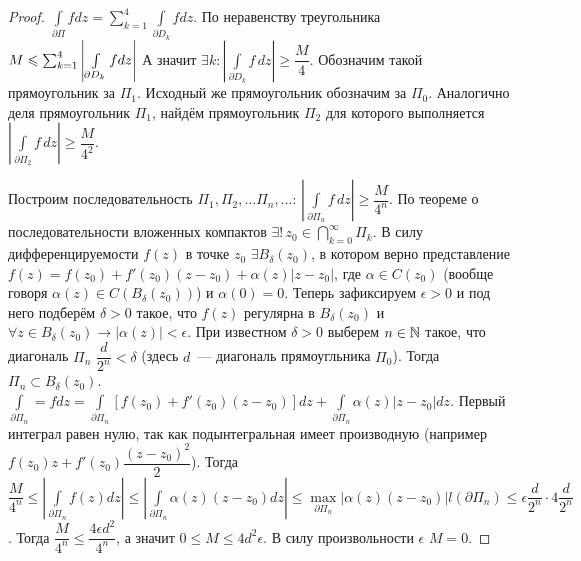 \begin{proof}
\begin{minipage}[c]{0.28\textwidth}
\end{minipage}%
\hfill
\begin{minipage}[c]{0.70\textwidth}
    \(\int\limits_{\partial\Pi} fdz = \sum_{k=1}^{4} \int\limits_{\partial D_k} fdz.\)
    По неравенству треугольника \(M \hm\le \sum_{k=1}^{4} \left|\int\limits_{\partial D_k} fdz
    \right|\) А значит \(\exists k : \left| \int\limits_{\partial D_k} f\,dz \right| \ge
    \dfrac{M}{4}.\) Обозначим такой прямоугольник за \(\Pi_1\). Исходный же прямоугольник обозначим
    за \(\Pi_0\). Аналогично деля прямоугольник \(\Pi_1\), найдём прямоугольник \(\Pi_2\) для
    которого выполняется \( \left| \int\limits_{\partial \Pi_2} f\,dz \right| \ge \dfrac{M}{4^2}\).
\end{minipage}
    Построим последовательность \(\Pi_1, \Pi_2, \dots \Pi_n, \dots \colon \, \left|
    \int\limits_{\partial \Pi_n} f\,dz \right| \ge \dfrac{M}{4^n}\). По теореме о последовательности
    вложенных компактов \(\exists ! \, z_0 \in \bigcap\limits_{k=0}^\infty \Pi_k\). В силу
    дифференцируемости \(f(z)\) в точке \(z_0\) \(\exists B_\delta (z_0)\), в котором верно
    представление \(f(z) = f(z_0) + f'(z_0)(z-z_0) + \alpha(z)|z-z_0|\), где \(\alpha \in C(z_0)\)
    (вообще говоря \(\alpha(z) \in C(B_\delta(z_0))\)) и \(\alpha(0) = 0\). Теперь зафиксируем
    \(\epsilon > 0\) и под него подберём \(\delta > 0\) такое, что \(f(z)\) регулярна в \(B_\delta
    (z_0)\) и \(\forall z \in B_\delta(z_0) \rightarrow |\alpha(z)| < \epsilon\). При известном
    \(\delta > 0\) выберем \(n \in \mathbb{N}\) такое, что диагональ \(\Pi_n\) \(\dfrac{d}{2^n} < \delta\)
    (здесь \(d\)~--- диагональ прямоугльника \(\Pi_0\)). Тогда \(\Pi_n \subset B_\delta (z_0)\).
    \(\int\limits_{\partial \Pi_n} = f dz = \int\limits_{\partial \Pi_n} [f(z_0) + f'(z_0)(z-z_0)]
    dz + \int\limits_{\partial \Pi_n} \alpha(z)|z-z_0|dz\). Первый интеграл равен нулю, так как
    подынтегральная имеет производную (например \(f(z_0)z + f'(z_0)\dfrac{(z-z_0)^2}{2}\)).
    Тогда \(\dfrac{M}{4^n} \le \left|\int\limits_{\partial \Pi_n} f(z) dz\right| \le
    \left|\int\limits_{\partial \Pi_n} \alpha(z)(z-z_0)dz\right| \le \max\limits_{\partial \Pi_n}
    |\alpha(z)(z-z_0)| l(\partial \Pi_n) \le \epsilon \dfrac{d}{2^n} \cdot 4 \dfrac{d}{2^n}\).
    Тогда \(\dfrac{M}{4^n} \le \dfrac{4\epsilon d^2}{4^n}\), а значит \(0 \le M \le 4d^2\epsilon\).
    В силу произвольности \(\epsilon\) \(M = 0\).
\end{proof}


